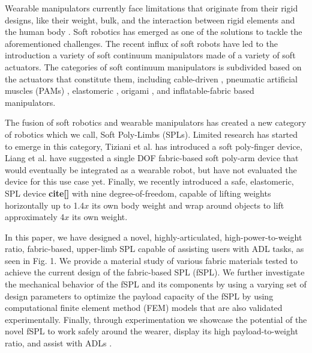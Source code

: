 \documentclass[letterpaper, 10 pt, conference]{ieeeconf}  %
\begin{document}
Wearable manipulators currently face limitations that originate from their rigid designs, like their weight, bulk, and the interaction between rigid elements and the human body \cite{delAma2012}. Soft robotics has emerged as one of the solutions to tackle the aforementioned challenges. The recent influx of soft robots have led to the introduction a variety of soft continuum manipulators made of a variety of soft actuators. The categories of soft continuum manipulators is subdivided based on the actuators that constitute them, including cable-driven \cite{mcMahan2005,calisti2011}, pneumatic artificial muscles (PAMs) \cite{walker2005,godage2016,yasmin2017,giannaccini2017}, elastomeric \cite{cianchetti2013,marchese2015,robertson2017,gong2018}, origami \cite{santoso2017}, and inflatable-fabric \cite{sanan2013,hawkes2017,ohta2017,best2016,liang2018,takeichi2017,kim2018,liang2017c} based manipulators. 
% 
% 

The fusion of soft robotics and wearable manipulators has created a new category of robotics which we call, Soft Poly-Limbs (SPLs). Limited research has started to emerge in this category, Tiziani et al. \cite{tiziani2017} has introduced a soft poly-finger device, Liang et al. \cite{liang2017c} have suggested a single DOF fabric-based soft poly-arm device that would eventually be integrated as a wearable robot, but have not evaluated the device for this use case yet. Finally, we recently introduced a safe, elastomeric, SPL device \textbf{cite[]} with nine degree-of-freedom, capable of lifting weights horizontally up to 1.4$x$ its own body weight and wrap around objects to lift approximately 4$x$ its own weight. 
% 
% 

In this paper, we have designed a novel, highly-articulated, high-power-to-weight ratio, fabric-based, upper-limb SPL capable of assisting users with ADL tasks, as seen in Fig. 1. We provide a material study of various fabric materials tested to achieve the current design of the fabric-based SPL (fSPL). We further investigate the mechanical behavior of the fSPL and its components by using a varying set of design parameters to optimize the payload capacity of the fSPL by using computational finite element method (FEM) models that are also validated experimentally. Finally, through experimentation we showcase the potential of the novel fSPL to work safely around the wearer, display its high payload-to-weight ratio, and assist with ADLs . 
\end{document}
